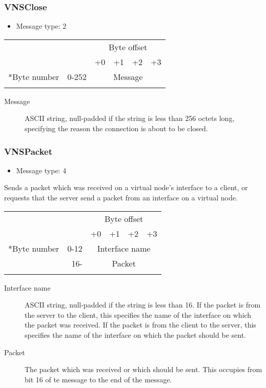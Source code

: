\documentclass[a4paper,12pt]{report}
\begin{document}
\subsubsection{VNSClose}
\begin{itemize}
\item Message type: 2
\end{itemize}
\begin{center}
\begin{tabular}{r r | c | c | c | c |}
 & & \multicolumn{4}{c}{Byte offset} \\
 & & +0 & +1 & +2 & +3 \\
\hhline{~-----}
\multirow{1}*{Byte number} & 0-252 & \multicolumn{4}{c|}{Message} \\
\hhline{~~----}
\end{tabular}
\end{center}
\begin{description}
\item[Message] ASCII string, null-padded if the string is less than 256 octets long, specifying the reason the connection is about to be closed.
\end{description}

\subsubsection{VNSPacket}
\begin{itemize}
\item Message type: 4
\end{itemize}
Sends a packet which was received on a virtual node's interface to a client, or requests that the server send a packet from an interface on a virtual node.
\begin{center}
\begin{tabular}{r r | c | c | c | c |}
 & & \multicolumn{4}{c}{Byte offset} \\
 & & +0 & +1 & +2 & +3 \\
\hhline{~-----}
\multirow{2}*{Byte number} & 0-12 & \multicolumn{4}{c|}{Interface name} \\
\hhline{~~----}
 & 16- & \multicolumn{4}{c|}{Packet} \\
\hhline{~~----}
\end{tabular}
\end{center}
\begin{description}
\item[Interface name]  ASCII string, null-padded if the string is less than 16.  If the packet is from the server to the client, this specifies the name of the interface on which the packet was received.  If the packet is from the client to the server, this specifies the name of the interface on which the packet should be sent.
\item[Packet]  The packet which was received or which should be sent.  This occupies from bit 16 of te message to the end of the message.
\end{description}
\end{document}
